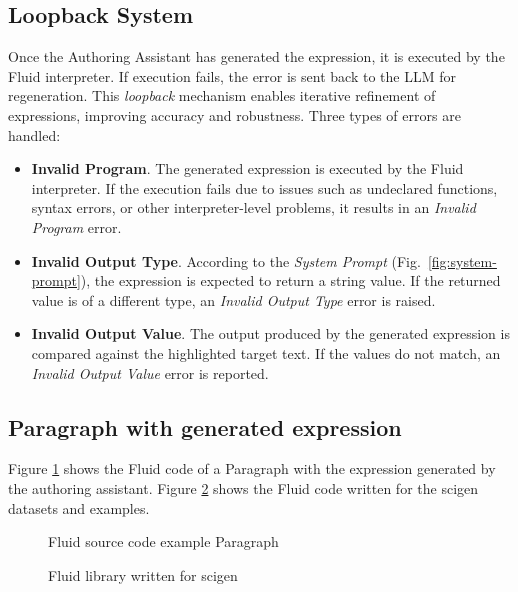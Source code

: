 \subsection{Loopback System}
\label{subsec:loopback-system}

Once the Authoring Assistant has generated the expression, it is executed by the Fluid interpreter.
If execution fails, the error is sent back to the LLM for regeneration.
This \textit{loopback} mechanism enables iterative refinement of expressions, improving accuracy and robustness.
Three types of errors are handled:

\begin{itemize}
    \item \textbf{Invalid Program}.
    The generated expression is executed by the Fluid interpreter.
    If the execution fails due to issues such as undeclared functions, syntax errors, or other interpreter-level problems, it results in an \textit{Invalid Program} error.
    \item \textbf{Invalid Output Type}.
    According to the \textit{System Prompt} (Fig.~\ref{fig:system-prompt}), the expression is expected to return a string value.
    If the returned value is of a different type, an \textit{Invalid Output Type} error is raised.
    \item \textbf{Invalid Output Value}.
    The output produced by the generated expression is compared against the highlighted target text.
    If the values do not match, an \textit{Invalid Output Value} error is reported.
\end{itemize}

\subsection{Paragraph with generated expression}
\label{subsec:paragraph-with-generated-expression}
Figure \ref{fig:fluid-example-paragraph} shows the Fluid code of a Paragraph with the expression generated by the authoring assistant.
Figure \ref{fig:fluid-scigen} shows the Fluid code written for the scigen datasets and examples.
\begin{figure}[h]
    \small
    {}
    \vspace{-0.5em}
    \caption{Fluid source code example Paragraph}
    \label{fig:fluid-example-paragraph}
\end{figure}

\begin{figure}[h]
    \small
    {}
    \caption{Fluid library written for scigen}
    \label{fig:fluid-scigen}
\end{figure}

